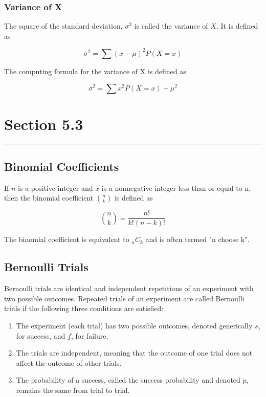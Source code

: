 \documentclass[12pt]{article}
\begin{document}
            \subsubsection*{Variance of X}
                The square of the standard deviation, $\sigma^2$ is called the variance of $X$. It is defined
                as 
                \begin{center}
                    \[
                        \sigma^2 = \sum (x - \mu)^2 P(X = x)    
                    \]
                \end{center}
                The computing formula for the variance of X is defined as
                \begin{center}
                    \[
                        \sigma^2 = \sum x^2 P(X = x) - \mu^2   
                    \]
                \end{center}
    \section*{Section 5.3}
    \noindent\rule{\textwidth}{0.4pt}
        \subsection*{Binomial Coefficients}
            If $n$ is a positive integer and $x$ is a nonnegative integer less than or equal to n, then the
            binomial coefficient ${n \choose k}$ is defined as
            \begin{center}
                \[
                    {n \choose k} = \frac{n!}{k!(n-k)!}    
                \]             
            \end{center}
            The binomial coefficient is equivalent to $_nC_k$ and is often termed "n choose k".
        \subsection*{Bernoulli Trials}
            Bernoulli trials are identical and independent repetitions of an experiment with two possible
            outcomes. Repeated trials of an experiment are called Bernoulli trials if the following three 
            conditions are satisfied:
            \begin{enumerate}
                \item The experiment (each trial) has two possible outcomes, denoted generically $s$, for
                success, and $f$, for failure.
                \item The trials are independent, meaning that the outcome of one trial does not affect the
                outcome of other trials.
                \item The probability of a success, called the success probability and denoted $p$, remains
                the same from trial to trial.
            \end{enumerate}
\end{document}
